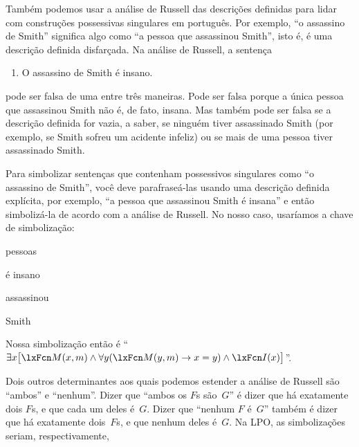 Também podemos usar a análise de Russell das descrições definidas para lidar com construções possessivas singulares em português. Por exemplo, \textquotedblleft o assassino de Smith\textquotedblright{} significa algo como \textquotedblleft a pessoa que assassinou Smith\textquotedblright{}, isto é, é uma descrição definida disfarçada. Na análise de Russell, a sentença
\begin{enumerate}
\item\label{smithsmurder} O assassino de Smith é insano.
\end{enumerate}
pode ser falsa de uma entre três maneiras. Pode ser falsa porque a única pessoa que assassinou Smith não é, de fato, insana. Mas também pode ser falsa se a descrição definida for vazia, a saber, se ninguém tiver assassinado Smith (por exemplo, se Smith sofreu um acidente infeliz) ou se mais de uma pessoa tiver assassinado Smith.

Para simbolizar sentenças que contenham possessivos singulares como \textquotedblleft o assassino de Smith\textquotedblright{}, você deve parafraseá-las usando uma descrição definida explícita, por exemplo, \textquotedblleft a pessoa que assassinou Smith é insana\textquotedblright{} e então simbolizá-la de acordo com a análise de Russell. No nosso caso, usaríamos a chave de simbolização:
\begin{ekey}
\item[$Domínio$] pessoas
\item[\atom{I}{x}]  é insano
\item[\atom{M}{x,y}]  assassinou 
	\item[m] Smith
\end{ekey}
Nossa simbolização então é \textquotedblleft $\exists x\bigl[\atom{M}{x,m} \eand \forall y(\atom{M}{y,m} \eif x=y) \eand \atom{I}{x}\bigr]$\textquotedblright{}.

Dois outros determinantes aos quais podemos estender a análise de Russell são \textquotedblleft ambos\textquotedblright{} e \textquotedblleft nenhum\textquotedblright{}. Dizer que \textquotedblleft ambos os $F$s são~$G$\textquotedblright{} é dizer que há exatamente dois $F$s, e que cada um deles é~$G$. Dizer que \textquotedblleft nenhum $F$ é~$G$\textquotedblright{} também é dizer que há exatamente dois~$F$s, e que nenhum deles é~$G$. Na LPO, as simbolizações seriam, respectivamente,





